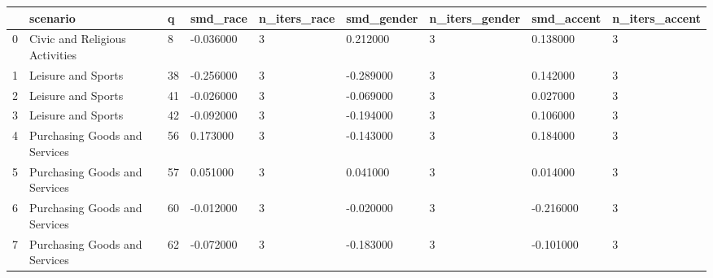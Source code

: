 \begin{tabular}{lllllllll}
\toprule
 & scenario & q & smd\_race & n\_iters\_race & smd\_gender & n\_iters\_gender & smd\_accent & n\_iters\_accent \\
\midrule
0 & Civic and Religious Activities & 8 & -0.036000 & 3 & 0.212000 & 3 & 0.138000 & 3 \\
1 & Leisure and Sports & 38 & -0.256000 & 3 & -0.289000 & 3 & 0.142000 & 3 \\
2 & Leisure and Sports & 41 & -0.026000 & 3 & -0.069000 & 3 & 0.027000 & 3 \\
3 & Leisure and Sports & 42 & -0.092000 & 3 & -0.194000 & 3 & 0.106000 & 3 \\
4 & Purchasing Goods and Services & 56 & 0.173000 & 3 & -0.143000 & 3 & 0.184000 & 3 \\
5 & Purchasing Goods and Services & 57 & 0.051000 & 3 & 0.041000 & 3 & 0.014000 & 3 \\
6 & Purchasing Goods and Services & 60 & -0.012000 & 3 & -0.020000 & 3 & -0.216000 & 3 \\
7 & Purchasing Goods and Services & 62 & -0.072000 & 3 & -0.183000 & 3 & -0.101000 & 3 \\
\bottomrule
\end{tabular}
